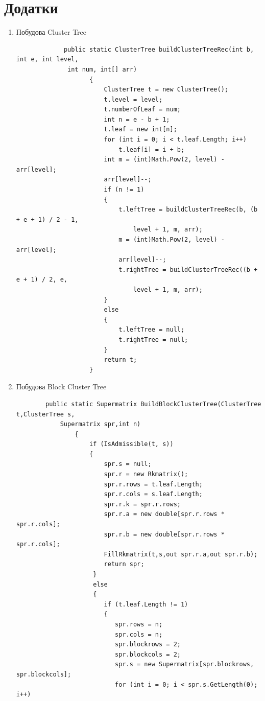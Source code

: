 \documentclass[12pt]{report}
\begin{document}
	\chapter{Додатки}
	\begin{enumerate}
		\item Побудова Cluster Tree
		
			\begin{verbatim}
			 public static ClusterTree buildClusterTreeRec(int b, int e, int level,
			  int num, int[] arr)
			        {
			            ClusterTree t = new ClusterTree();
			            t.level = level;
			            t.numberOfLeaf = num;
			            int n = e - b + 1;
			            t.leaf = new int[n];
			            for (int i = 0; i < t.leaf.Length; i++)
			                t.leaf[i] = i + b;
			            int m = (int)Math.Pow(2, level) - arr[level];
			            arr[level]--;
			            if (n != 1)
			            {
			                t.leftTree = buildClusterTreeRec(b, (b + e + 1) / 2 - 1,
			                    level + 1, m, arr);
			                m = (int)Math.Pow(2, level) - arr[level];
			                arr[level]--;
			                t.rightTree = buildClusterTreeRec((b + e + 1) / 2, e,
			                    level + 1, m, arr);
			            }
			            else
			            {
			                t.leftTree = null;
			                t.rightTree = null;
			            }
			            return t;
			        }
			\end{verbatim}
		\item Побудова Block Cluster Tree
		\begin{verbatim}
		public static Supermatrix BuildBlockClusterTree(ClusterTree t,ClusterTree s,
		    Supermatrix spr,int n)
		        {
		            if (IsAdmissible(t, s))
		            {
		                spr.s = null;
		                spr.r = new Rkmatrix();
		                spr.r.rows = t.leaf.Length;
		                spr.r.cols = s.leaf.Length;
		                spr.r.k = spr.r.rows;
		                spr.r.a = new double[spr.r.rows * spr.r.cols];
		                spr.r.b = new double[spr.r.rows * spr.r.cols];
		                FillRkmatrix(t,s,out spr.r.a,out spr.r.b);
		                return spr;
		             }
		             else
		             {
		                if (t.leaf.Length != 1)
		                {
		                   spr.rows = n;
		                   spr.cols = n;
		                   spr.blockrows = 2;
		                   spr.blockcols = 2;
		                   spr.s = new Supermatrix[spr.blockrows, spr.blockcols];
		                   for (int i = 0; i < spr.s.GetLength(0); i++)

\end{verbatim}
\end{enumerate}
\end{document}
